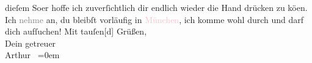                dieſem So{\geminationm}er hoffe ich zuverſichtlich dir
               endlich wieder die Hand drücken zu kö{\geminationn}en. Ich
                  \textcolor{gray}{nehme} an, du bleibſt vorläufig in \textcolor{pink}{München}{}\ledrightnote{\textcolor{pink}{München}}, {\pb}ich
               komme wohl durch und darf dich aufſuchen!\pend
           \pstart
           Mit tauſen{[}d{]} Grüßen,{\\[\baselineskip]}Dein getreuer{\\[\baselineskip]}\spacefill\mbox{Arthur }\pend
           \leftskip=0em{}\endnumbering{}  
      